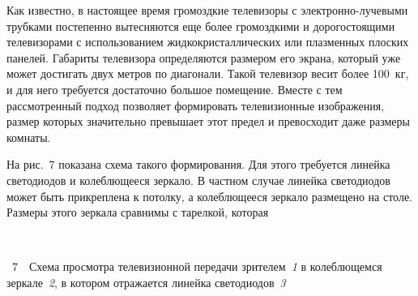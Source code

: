 \begin{multicols}{2}
  Как известно, в настоящее время громоздкие телевизоры с электронно-лучевыми 
трубками постепенно вытесняются еще более громоздкими и дорогостоящими 
телевизорами с использованием жидкокристаллических или плазменных плоских панелей. 
Габариты телевизора определяются размером его экрана, который уже может достигать 
двух метров по диагонали. Такой телевизор весит более 100~кг, и для него требуется 
достаточно большое помещение. Вместе с тем рассмотренный подход позволяет 
формировать телевизионные изображения, размер которых значительно превышает этот 
предел и превосходит даже размеры комнаты. 
  
  
  На рис.~7 показана схема такого формирования. Для этого требуется линейка 
светодиодов и колеблющееся зеркало. В частном случае линейка светодиодов может быть 
прикреплена к потолку, а колеблющееся зеркало размещено на столе. Размеры этого 
зеркала сравнимы с тарелкой, которая\linebreak\vspace*{-12pt}

\begin{center}
\vspace*{1pt}
\mbox{%
\epsfxsize=79.924mm
}
\end{center}
{{\figurename~7}\ \ \small{Схема просмотра телевизионной передачи зрителем~\textit{1} в колеблющемся 
зеркале~\textit{2}, в котором отражается линейка светодиодов~\textit{3}}}


\vspace*{6pt}
\bigskip
\addtocounter{figure}{1}  

   
     



\end{multicols}
